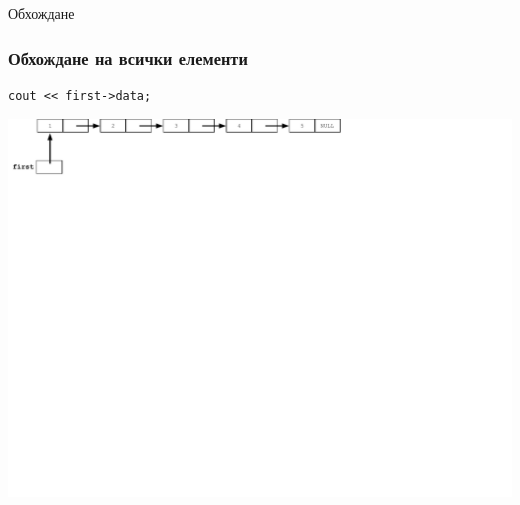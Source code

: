 \documentclass{beamer}
\begin{document}
\begin{frame}
\centerline{Обхождане}
\end{frame}



\begin{frame}[fragile]
\frametitle{Обхождане на всички елементи}

\begin{flushleft}
\begin{lstlisting}
cout << first->data;
\end{lstlisting}  
\end{flushleft}


\includegraphics[width=14.0cm]{images/02_ll_flatchain}

\end{frame}
\end{document}
